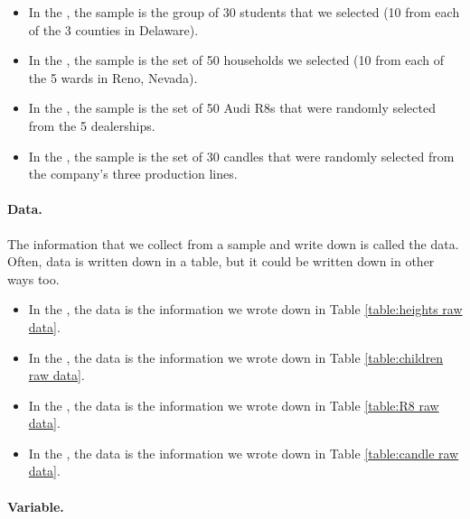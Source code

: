 \documentclass[../../../main.tex]{subfiles}
\begin{document}
\begin{itemize}

  \item In the , the sample is the group of 30 students that we selected (10 from each of the 3 counties in Delaware).
    
  \item In the , the sample is the set of 50 households we selected (10 from each of the 5 wards in Reno, Nevada). 
    
  \item In the , the sample is the set of 50 Audi R8s that were randomly selected from the 5 dealerships.
  
  \item In the , the sample is the set of 30 candles that were randomly selected from the company's three production lines.

\end{itemize}


\paragraph{Data.}

The information that we collect from a sample and write down is called the data. Often, data is written down in a table, but it could be written down in other ways too.

\begin{itemize}

  \item In the , the data is the information we wrote down in Table \ref{table:heights raw data}.
    
  \item In the , the data is the information we wrote down in Table \ref{table:children raw data}.
    
  \item In the , the data is the information we wrote down in Table \ref{table:R8 raw data}.
  
  \item In the , the data is the information we wrote down in Table \ref{table:candle raw data}.

\end{itemize}


\paragraph{Variable.}
\end{document}

